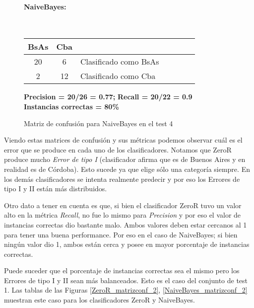 \begin{figure}[H]
\centering
\paragraph*{NaiveBayes:}\mbox{}\\
\begin{table}[H]
\centering
\begin{tabular}{|c|c|l|c|c|c|c|}
\hline
 BsAs & Cba &  \\ \hline
 20 &  6 &  Clasificado como BsAs \\ \hline
 2  &  12 &  Clasificado como Cba \\ \hline
\end{tabular}
\end{table}
\begin{center}
\textbf{Precision = 20/26 = 0.77;} \textbf{Recall = 20/22 = 0.9}\\
\textbf{Instancias correctas = 80\%}
\end{center}
\caption{Matriz de confusión para NaiveBayes en el test 4}
\label{NaiveBayes_matrizconf}
\end{figure}

Viendo estas matrices de confusión y sus métricas podemos observar cuál es el error que se produce en cada uno de los clasificadores. Notamos que ZeroR produce mucho \textit{Error de tipo I} (clasificador afirma que es de Buenos Aires y en realidad es de Córdoba). Esto sucede ya que elige sólo una categoría siempre. En los demás clasificadores se intenta realmente predecir y por eso los Errores de tipo I y II están más distribuidos.

Otro dato a tener en cuenta es que, si bien el clasificador ZeroR tuvo un valor alto en la métrica \textit{Recall}, no fue lo mismo para \textit{Precision} y por eso el valor de instancias correctas dio bastante malo. Ambos valores deben estar cercanos al 1 para tener una buena performance. Por eso en el caso de NaiveBayes; si bien ningún valor dio 1, ambos están cerca y posee en mayor porcentaje de instancias correctas.

Puede suceder que el porcentaje de instancias correctas sea el mismo pero los Errores de tipo I y II sean más balanceados. Esto es el caso del conjunto de test 1. Las tablas de las Figuras \ref{ZeroR_matrizconf_2}, \ref{NaiveBayes_matrizconf_2} muestran este caso para los clasificadores ZeroR y NaiveBayes.


